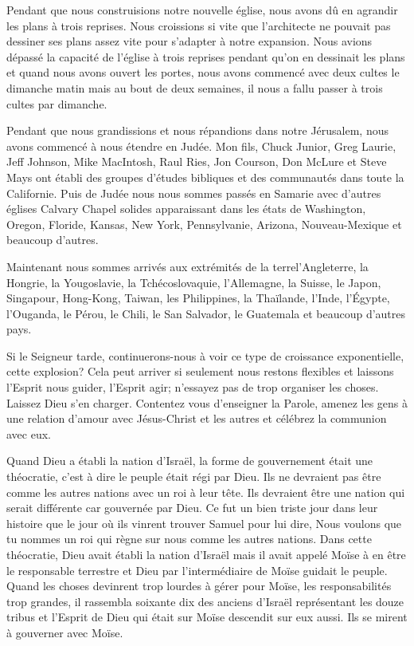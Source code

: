 Pendant que nous construisions notre nouvelle église, nous avons dû en agrandir les plans à trois reprises. Nous
croissions si vite que l’architecte ne pouvait pas dessiner ses plans assez vite pour s'adapter à notre expansion. Nous
avions dépassé la capacité de l’église à trois reprises pendant qu’on en dessinait les plans et quand nous avons ouvert
les portes, nous avons commencé avec deux cultes le dimanche matin mais au bout de deux semaines, il nous a fallu
passer à trois cultes par dimanche.

Pendant que nous grandissions et nous répandions dans notre Jérusalem, nous avons commencé à nous étendre en
Judée. Mon fils, Chuck Junior, Greg Laurie, Jeff Johnson, Mike MacIntosh, Raul Ries, Jon Courson, Don McLure et
Steve Mays ont établi des groupes d’études bibliques et des communautés dans toute la Californie. Puis de Judée
nous nous sommes passés en Samarie avec d’autres églises Calvary Chapel solides apparaissant dans les états de
Washington, Oregon, Floride, Kansas, New York, Pennsylvanie, Arizona, Nouveau-Mexique et beaucoup d’autres.

Maintenant nous sommes arrivés aux extrémités de la terre\frcolon l’Angleterre, la Hongrie, la Yougoslavie, la
Tchécoslovaquie, l’Allemagne, la Suisse, le Japon, Singapour, Hong-Kong, Taiwan, les Philippines, la Thaïlande, l’Inde,
l’Égypte, l’Ouganda, le Pérou, le Chili, le San Salvador, le Guatemala et beaucoup d’autres pays.

Si le Seigneur tarde, continuerons-nous à voir ce type de croissance exponentielle, cette explosion? Cela peut arriver
si seulement nous restons flexibles et laissons l’Esprit nous guider, l’Esprit agir; n’essayez pas de trop organiser les
choses. Laissez Dieu s’en charger. Contentez vous d’enseigner la Parole, amenez les gens à une relation d’amour avec
Jésus-Christ et les autres et célébrez la communion avec eux.

Quand Dieu a établi la nation d’Israël, la forme de gouvernement était une théocratie, c’est à dire le peuple était régi
par Dieu. Ils ne devraient pas être comme les autres nations avec un roi à leur tête. Ils devraient être une nation qui
serait différente car gouvernée par Dieu. Ce fut un bien triste jour dans leur histoire que le jour où ils vinrent trouver
Samuel pour lui dire, \og Nous voulons que tu nommes un roi qui règne sur nous comme les autres nations.\fg{} Dans cette
théocratie, Dieu avait établi la nation d’Israël mais il avait appelé Moïse à en être le responsable terrestre et Dieu par
l’intermédiaire de Moïse guidait le peuple. Quand les choses devinrent trop lourdes à gérer pour Moïse, les
responsabilités trop grandes, il rassembla soixante dix des anciens d’Israël représentant les douze tribus et l’Esprit de
Dieu qui était sur Moïse descendit sur eux aussi. Ils se mirent à gouverner avec Moïse.

